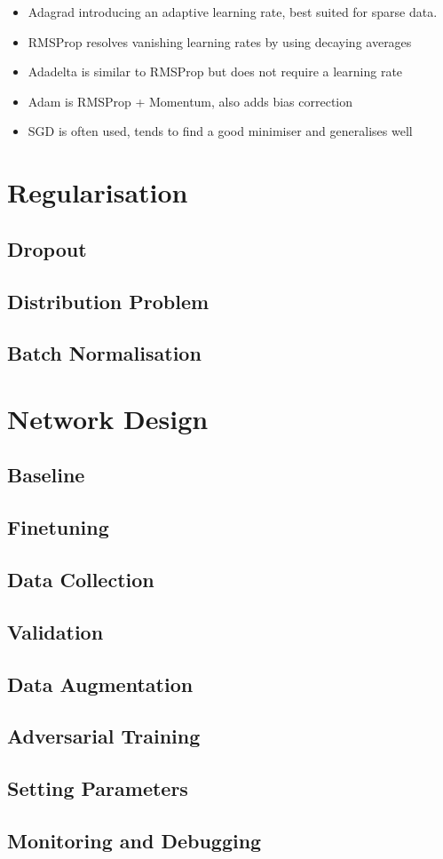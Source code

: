 \begin{itemize}
    \item Adagrad introducing an adaptive learning rate, best suited for sparse data.
    \item RMSProp resolves vanishing learning rates by using decaying averages
    \item Adadelta is similar to RMSProp but does not require a learning rate
    \item Adam is RMSProp + Momentum, also adds bias correction
    \item SGD is often used, tends to find a good minimiser and generalises well
\end{itemize}

\section{Regularisation}
\subsection{Dropout}
\subsection{Distribution Problem}
\subsection{Batch Normalisation}
\section{Network Design}
\subsection{Baseline}
\subsection{Finetuning}
\subsection{Data Collection}
\subsection{Validation}
\subsection{Data Augmentation}
\subsection{Adversarial Training}
\subsection{Setting Parameters}
\subsection{Monitoring and Debugging}




